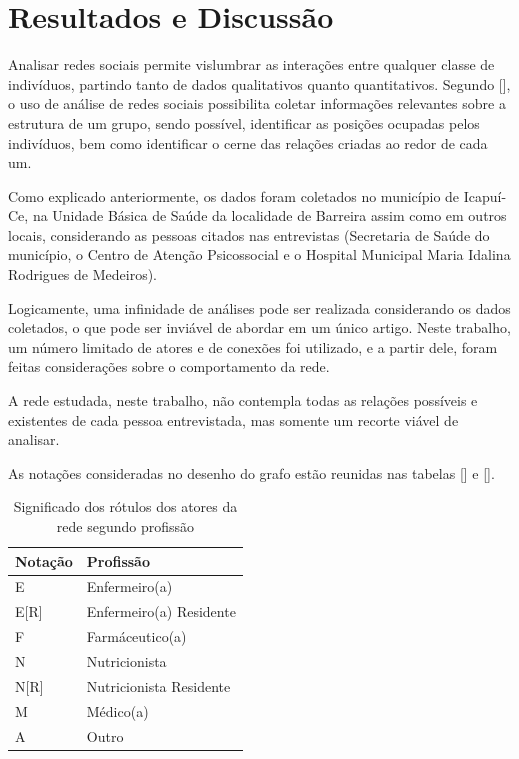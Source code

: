 \chapter{Resultados e Discussão}
\label{chap:resultados}

Analisar redes sociais permite vislumbrar as interações entre qualquer classe de indivíduos, partindo tanto de dados qualitativos quanto quantitativos. Segundo [],  o uso de  análise de redes sociais possibilita coletar informações relevantes sobre a estrutura de um grupo, sendo possível, identificar as posições ocupadas pelos indivíduos, bem como identificar o cerne das relações criadas ao redor de cada um.

Como explicado anteriormente, os dados foram coletados no município de Icapuí-Ce, na Unidade Básica de Saúde da localidade de Barreira assim como em outros locais, considerando as pessoas citados nas entrevistas (Secretaria de Saúde do município, o Centro de Atenção Psicossocial e o Hospital Municipal Maria Idalina Rodrigues de Medeiros).

Logicamente, uma infinidade de análises pode ser realizada considerando os dados coletados, o que pode ser inviável de abordar em um único artigo. Neste trabalho, um número limitado de atores e de conexões foi utilizado, e a partir dele, foram feitas considerações sobre o comportamento da rede.

A rede estudada, neste trabalho, não contempla todas as relações possíveis e existentes de cada pessoa entrevistada, mas somente um recorte viável de analisar.

As notações consideradas no desenho do grafo estão reunidas nas tabelas [] e [].

\begin{table}[]
\centering
\caption{Significado dos rótulos dos atores da rede segundo profissão}
\label{graph-job}
\begin{tabular}{|l|l|}
\hline
Notação  & Profissão               \\ \hline
E        & Enfermeiro(a)           \\ \hline
E{[}R{]} & Enfermeiro(a) Residente \\ \hline
F        & Farmáceutico(a)         \\ \hline
N        & Nutricionista           \\ \hline
N{[}R{]} & Nutricionista Residente \\ \hline
M        & Médico(a)               \\ \hline
A        & Outro                   \\ \hline
\end{tabular}
\end{table}

